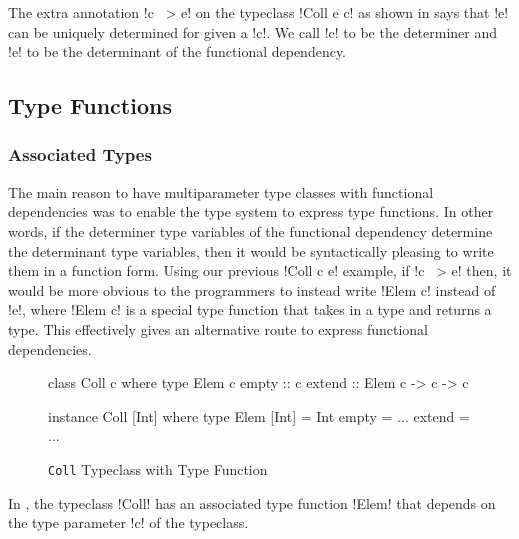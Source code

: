 \documentclass[manuscript,screen,nonacm]{acmart}
\begin{document}
The extra annotation !c ~> e! on the typeclass !Coll e c! as shown in  says that !e! can be uniquely determined for given a !c!.
We call !c! to be the determiner and !e! to be the determinant of the functional dependency.

%

\subsection{Type Functions}
\subsubsection{Associated Types}
The main reason to have multiparameter type classes with functional dependencies was to enable the type system to express type functions. In other words, if the determiner type variables of the functional dependency determine the determinant type variables, then it would be syntactically pleasing to write them in a function form.
Using our previous !Coll c e! example, if !c ~> e! then, it would be more obvious to the programmers to instead write !Elem c! instead of !e!, where !Elem c! is a special type function that takes in a type and returns a type. This effectively gives an alternative route to express functional dependencies.
\begin{figure}[ht]
  \begin{center}
    \begin{minipage}[ht]{0.4\linewidth}
      \begin{code}
        class Coll c where
           type Elem c
           empty :: c
           extend :: Elem c -> c -> c
      \end{code}
    \end{minipage}%
    \begin{minipage}[ht]{0.4\linewidth}
      \begin{code}
        instance Coll [Int] where
           type Elem [Int] = Int
           empty = ...
           extend = ...
      \end{code}
    \end{minipage}
  \end{center}
  \caption[Collection typeclass]{\lstinline{Coll} Typeclass with Type Function}
  \label{fig:type-fam}
\end{figure}

In , the typeclass !Coll! has an associated type function !Elem! that depends on the type parameter !c! of the typeclass. 
\end{document}
